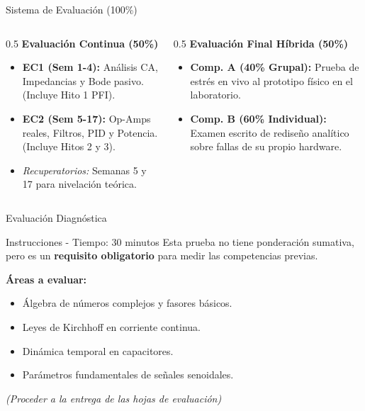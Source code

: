 \documentclass[aspectratio=169, 10pt]{beamer}
\begin{document}
\begin{frame}{Sistema de Evaluación (100\%)}
    \begin{columns}[T]
        \begin{column}{0.5\textwidth}
            \textbf{Evaluación Continua (50\%)}
            \begin{itemize}
                \item \textbf{EC1 (Sem 1-4):} Análisis CA, Impedancias y Bode pasivo. (Incluye Hito 1 PFI).
                \item \textbf{EC2 (Sem 5-17):} Op-Amps reales, Filtros, PID y Potencia. (Incluye Hitos 2 y 3).
                \item \textit{Recuperatorios:} Semanas 5 y 17 para nivelación teórica.
            \end{itemize}
        \end{column}
        \begin{column}{0.5\textwidth}
            \textbf{Evaluación Final Híbrida (50\%)}
            \begin{itemize}
                \item \textbf{Comp. A (40\% Grupal):} Prueba de estrés en vivo al prototipo físico en el laboratorio.
                \item \textbf{Comp. B (60\% Individual):} Examen escrito de rediseño analítico sobre fallas de su propio hardware.
            \end{itemize}
        \end{column}
    \end{columns}
\end{frame}

\begin{frame}{Evaluación Diagnóstica}
    \begin{alertblock}{Instrucciones - Tiempo: 30 minutos}
        Esta prueba no tiene ponderación sumativa, pero es un \textbf{requisito obligatorio} para medir las competencias previas.
    \end{alertblock}
    
    \vspace{0.3cm}
    \textbf{Áreas a evaluar:}
    \begin{itemize}
        \item Álgebra de números complejos y fasores básicos.
        \item Leyes de Kirchhoff en corriente continua.
        \item Dinámica temporal en capacitores.
        \item Parámetros fundamentales de señales senoidales.
    \end{itemize}
    \vspace{0.3cm}
    \centering \textit{(Proceder a la entrega de las hojas de evaluación)}
\end{frame}
\end{document}
